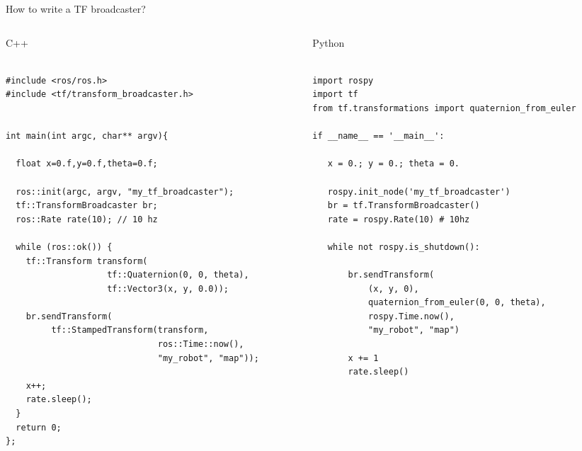 \documentclass[compress]{beamer}
\begin{document}
\begin{frame}[fragile]{How to write a TF broadcaster?}

    \begin{columns}
        \begin{column}{0.5\linewidth}
            \begin{center}C++
            \end{center}
\begin{verbatim}

#include <ros/ros.h>
#include <tf/transform_broadcaster.h>


int main(int argc, char** argv){

  float x=0.f,y=0.f,theta=0.f;

  ros::init(argc, argv, "my_tf_broadcaster");
  tf::TransformBroadcaster br;
  ros::Rate rate(10); // 10 hz

  while (ros::ok()) {
    tf::Transform transform(
                    tf::Quaternion(0, 0, theta), 
                    tf::Vector3(x, y, 0.0));

    br.sendTransform(
         tf::StampedTransform(transform, 
                              ros::Time::now(), 
                              "my_robot", "map"));

    x++;
    rate.sleep();
  }
  return 0;
};
\end{verbatim}

            
        \end{column}
        \begin{column}{0.5\linewidth}
            \begin{center}Python
            \end{center}

\begin{verbatim}

import rospy
import tf
from tf.transformations import quaternion_from_euler

if __name__ == '__main__':

   x = 0.; y = 0.; theta = 0.

   rospy.init_node('my_tf_broadcaster')
   br = tf.TransformBroadcaster()
   rate = rospy.Rate(10) # 10hz

   while not rospy.is_shutdown():

       br.sendTransform(
           (x, y, 0),
           quaternion_from_euler(0, 0, theta),
           rospy.Time.now(),
           "my_robot", "map")

       x += 1
       rate.sleep()

\end{verbatim}

            \vspace{2em}
        \end{column}
    \end{columns}

\end{frame}
\end{document}
